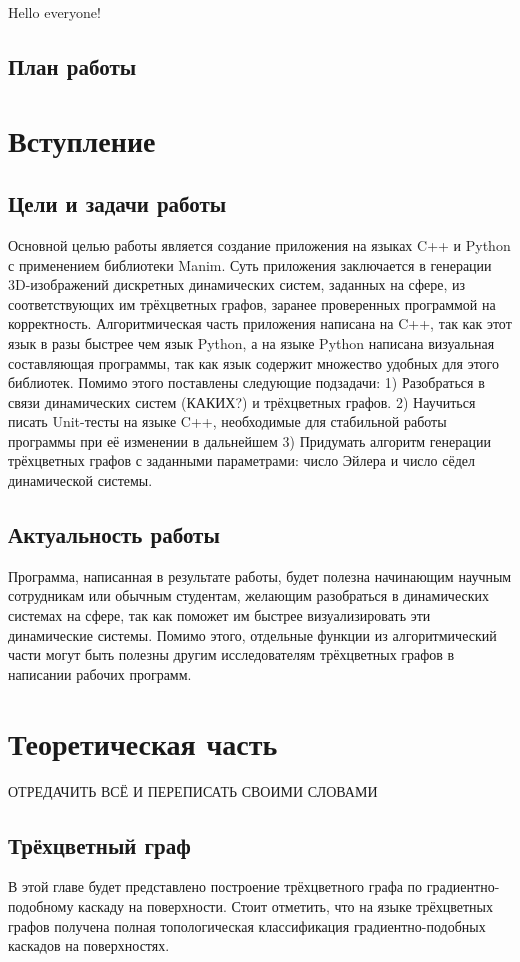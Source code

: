 


	\textsf{Hello everyone!}
	\subsection*{План работы}
	\section{Вступление}
	\subsection{Цели и задачи работы}
		Основной целью работы является создание приложения на языках C++ и Python с применением библиотеки Manim. Суть приложения заключается в генерации 3D-изображений дискретных динамических систем, заданных на сфере, из соответствующих им трёхцветных графов, заранее проверенных программой на корректность. Алгоритмическая часть приложения написана на C++, так как этот язык в разы быстрее чем язык Python, а на языке Python написана визуальная составляющая программы, так как язык содержит множество удобных для этого библиотек. Помимо этого поставлены следующие подзадачи:
		1) Разобраться в связи динамических систем (КАКИХ?) и трёхцветных графов.
		2) Научиться писать Unit-тесты на языке C++, необходимые для стабильной работы программы при её изменении в дальнейшем
		3) Придумать алгоритм генерации трёхцветных графов с заданными параметрами: число Эйлера и число сёдел динамической системы.
	\subsection{Актуальность работы}
		Программа, написанная в результате работы, будет полезна начинающим научным сотрудникам или обычным студентам, желающим разобраться в динамических системах на сфере, так как поможет им быстрее визуализировать эти динамические системы. Помимо этого, отдельные функции из алгоритмический части могут быть полезны другим исследователям трёхцветных графов в написании рабочих программ.
	\section{Теоретическая часть}
	ОТРЕДАЧИТЬ ВСЁ И ПЕРЕПИСАТЬ СВОИМИ СЛОВАМИ
	\subsection*{Трёхцветный граф}
	В этой главе будет представлено построение трёхцветного графа по градиентно-подобному каскаду на поверхности. Стоит отметить, что на языке трёхцветных графов получена полная топологическая классификация градиентно-подобных каскадов на поверхностях.
